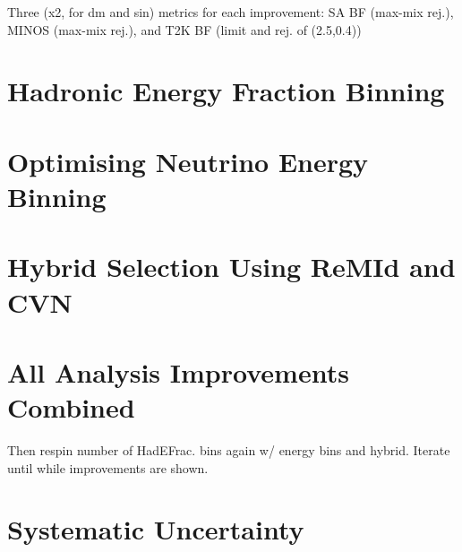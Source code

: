 

Three (x2, for dm and sin) metrics for each improvement: SA BF (max-mix rej.), MINOS (max-mix rej.), and T2K BF (limit and rej. of (2.5,0.4))

\section{Hadronic Energy Fraction Binning}

\section{Optimising Neutrino Energy Binning}

\section{Hybrid Selection Using ReMId and CVN}

\section{All Analysis Improvements Combined}

Then respin number of HadEFrac. bins again w/ energy bins and hybrid. Iterate until while improvements are shown. 


\section{Systematic Uncertainty}